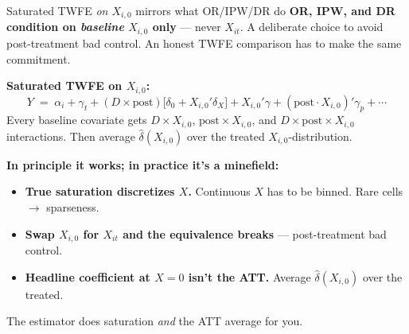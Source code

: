 \documentclass[aspectratio=169,11pt]{beamer}
\begin{document}
\begin{frame}{Saturated TWFE \textit{on $X_{i,0}$} mirrors what OR/IPW/DR do}
\footnotesize
\textbf{OR, IPW, and DR condition on \textit{baseline} $X_{i,0}$ only} --- never $X_{it}$. \;A deliberate choice to avoid post-treatment bad control. \;An honest TWFE comparison has to make the same commitment.

\vspace{0.4em}
\textbf{Saturated TWFE on $X_{i,0}$:}
\[
Y \;=\; \alpha_i + \gamma_t + (D{\times}\text{post})\big[\delta_0 + X_{i,0}'\delta_X\big] + X_{i,0}'\gamma + (\text{post}{\cdot} X_{i,0})'\gamma_p + \cdots
\]
Every baseline covariate gets $D{\times}X_{i,0}$, $\text{post}{\times}X_{i,0}$, and $D{\times}\text{post}{\times}X_{i,0}$ interactions. \;Then average $\hat\delta(X_{i,0})$ over the treated $X_{i,0}$-distribution.

\vspace{0.4em}
\textbf{In principle it works; in practice it's a minefield:}
\begin{itemize}\setlength\itemsep{0pt}
  \item \textbf{True saturation discretizes $X$.} \;Continuous $X$ has to be binned. \;Rare cells $\to$ sparseness.
  \item \textbf{Swap $X_{i,0}$ for $X_{it}$ and the equivalence breaks} --- post-treatment bad control.
  \item \textbf{Headline coefficient at $X=0$ isn't the ATT.} \;Average $\hat\delta(X_{i,0})$ over the treated.
\end{itemize}

 \;The estimator does saturation \textit{and} the ATT average for you. \;
\end{frame}
\end{document}
